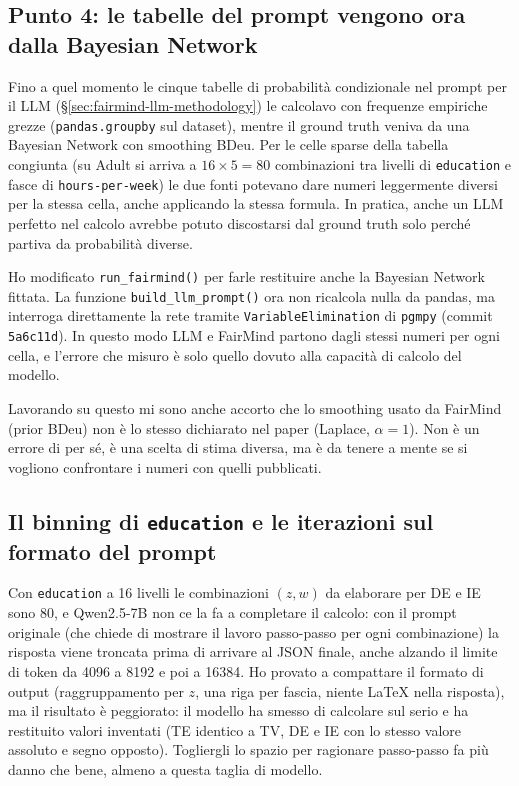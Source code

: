 \subsection*{Punto 4: le tabelle del prompt vengono ora dalla Bayesian Network}

Fino a quel momento le cinque tabelle di probabilità condizionale nel prompt per il LLM (\S\ref{sec:fairmind-llm-methodology}) le calcolavo con frequenze empiriche grezze (\texttt{pandas.groupby} sul dataset), mentre il ground truth veniva da una Bayesian Network con smoothing BDeu. Per le celle sparse della tabella congiunta (su Adult si arriva a $16 \times 5 = 80$ combinazioni tra livelli di \texttt{education} e fasce di \texttt{hours-per-week}) le due fonti potevano dare numeri leggermente diversi per la stessa cella, anche applicando la stessa formula. In pratica, anche un LLM perfetto nel calcolo avrebbe potuto discostarsi dal ground truth solo perché partiva da probabilità diverse.

Ho modificato \texttt{run\_fairmind()} per farle restituire anche la Bayesian Network fittata. La funzione \texttt{build\_llm\_prompt()} ora non ricalcola nulla da pandas, ma interroga direttamente la rete tramite \texttt{VariableElimination} di \texttt{pgmpy} (commit \texttt{5a6c11d}). In questo modo LLM e FairMind partono dagli stessi numeri per ogni cella, e l'errore che misuro è solo quello dovuto alla capacità di calcolo del modello.

Lavorando su questo mi sono anche accorto che lo smoothing usato da FairMind (prior BDeu) non è lo stesso dichiarato nel paper (Laplace, $\alpha=1$). Non è un errore di per sé, è una scelta di stima diversa, ma è da tenere a mente se si vogliono confrontare i numeri con quelli pubblicati.

\subsection*{Il binning di \texttt{education} e le iterazioni sul formato del prompt}

Con \texttt{education} a 16 livelli le combinazioni $(z,w)$ da elaborare per DE e IE sono 80, e Qwen2.5-7B non ce la fa a completare il calcolo: con il prompt originale (che chiede di mostrare il lavoro passo-passo per ogni combinazione) la risposta viene troncata prima di arrivare al JSON finale, anche alzando il limite di token da 4096 a 8192 e poi a 16384. Ho provato a compattare il formato di output (raggruppamento per $z$, una riga per fascia, niente LaTeX nella risposta), ma il risultato è peggiorato: il modello ha smesso di calcolare sul serio e ha restituito valori inventati (TE identico a TV, DE e IE con lo stesso valore assoluto e segno opposto). Togliergli lo spazio per ragionare passo-passo fa più danno che bene, almeno a questa taglia di modello.

